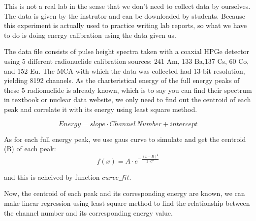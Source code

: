 This is not a real lab in the sense that we don't need to collect data by ourselves. The data is given by the instrutor and can be downloaded by students. Because this experiment is actually used to practice writing lab reports, so what we have to do is doing energy calibration using the data given us.

The data file consists of pulse height spectra taken with a coaxial HPGe detector using 5 different radionuclide calibration sources: 241 Am, 133 Ba,137 Cs, 60 Co, and 152 Eu. The MCA with which the data was collected had 13-bit resolution, yielding 8192 channels. As the charteristical energy of the full energy peaks of these 5 radionuclide is already known, which is to say you can find their spectrum in textbook or nuclear data website, we only need to find out the centroid of each peak and correlate it with its energy using least square method.


\[Energy=slope\cdot Channel\,Number + intercept\]

As for each full energy peak, we use gaus curve to simulate and get the centroid (B) of each peak:
\[f\left( x \right) = A \cdot {e^{ - \frac{{{{\left( {x - B} \right)}^2}}}{{2 \cdot {C^2}}}}}\]

and this is acheived by function $curve\_fit$.

Now, the centroid of each peak and its corresponding energy are known, we can make linear regression using least square method to find the relationship between the channel number and its corresponding energy value.


